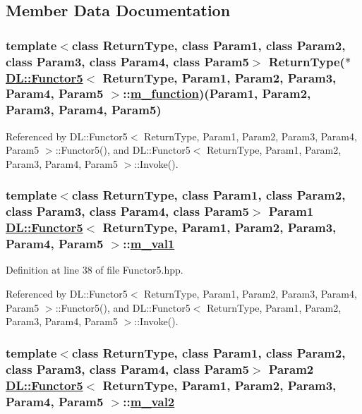\subsection{Member Data Documentation}
\hypertarget{classDL_1_1Functor5_r0}{
\subsubsection[m\_\-function]{\setlength{\rightskip}{0pt plus 5cm}template$<$class Return\-Type, class Param1, class Param2, class Param3, class Param4, class Param5$>$ Return\-Type($\ast$ \hyperlink{classDL_1_1Functor5}{DL::Functor5}$<$ Return\-Type, Param1, Param2, Param3, Param4, Param5 $>$::\hyperlink{classDL_1_1Functor5_r0}{m\_\-function})(Param1, Param2, Param3, Param4, Param5)}}
\label{classDL_1_1Functor5_r0}




Referenced by DL::Functor5$<$ Return\-Type, Param1, Param2, Param3, Param4, Param5 $>$::Functor5(), and DL::Functor5$<$ Return\-Type, Param1, Param2, Param3, Param4, Param5 $>$::Invoke().\hypertarget{classDL_1_1Functor5_r1}{
\subsubsection[m\_\-val1]{\setlength{\rightskip}{0pt plus 5cm}template$<$class Return\-Type, class Param1, class Param2, class Param3, class Param4, class Param5$>$ Param1 \hyperlink{classDL_1_1Functor5}{DL::Functor5}$<$ Return\-Type, Param1, Param2, Param3, Param4, Param5 $>$::\hyperlink{classDL_1_1Functor5_r1}{m\_\-val1}}}
\label{classDL_1_1Functor5_r1}




Definition at line 38 of file Functor5.hpp.

Referenced by DL::Functor5$<$ Return\-Type, Param1, Param2, Param3, Param4, Param5 $>$::Functor5(), and DL::Functor5$<$ Return\-Type, Param1, Param2, Param3, Param4, Param5 $>$::Invoke().\hypertarget{classDL_1_1Functor5_r2}{
\subsubsection[m\_\-val2]{\setlength{\rightskip}{0pt plus 5cm}template$<$class Return\-Type, class Param1, class Param2, class Param3, class Param4, class Param5$>$ Param2 \hyperlink{classDL_1_1Functor5}{DL::Functor5}$<$ Return\-Type, Param1, Param2, Param3, Param4, Param5 $>$::\hyperlink{classDL_1_1Functor5_r2}{m\_\-val2}}}
\label{classDL_1_1Functor5_r2}




